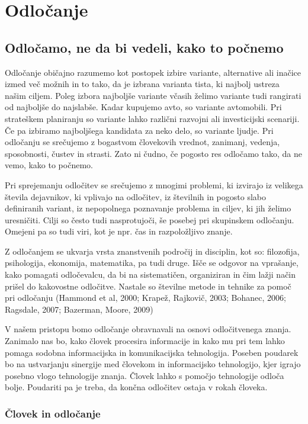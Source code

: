 \chapter{Odločanje}

\section{Odločamo, ne da bi vedeli, kako to počnemo}

Odločanje običajno razumemo kot postopek izbire variante, alternative ali inačice izmed več možnih in to tako, da je izbrana varianta tista, ki najbolj ustreza našim ciljem. Poleg izbora najboljše variante včasih želimo variante tudi rangirati od najboljše do najslabše. Kadar kupujemo avto, so variante avtomobili. Pri strateškem planiranju so variante lahko različni razvojni ali investicijski scenariji. Če pa izbiramo najboljšega kandidata za neko delo, so variante ljudje. Pri odločanju se srečujemo z bogastvom človekovih vrednot, zanimanj, vedenja, sposobnosti, čustev in strasti. Zato ni čudno, če pogosto res odločamo tako, da ne vemo, kako to počnemo.

Pri sprejemanju odločitev se srečujemo z mnogimi problemi, ki izvirajo iz velikega števila dejavnikov, ki vplivajo na odločitev, iz številnih in pogosto slabo definiranih variant, iz nepopolnega poznavanje problema in ciljev, ki jih želimo uresničiti. Cilji so često tudi nasprotujoči, še posebej pri skupinskem odločanju.  Omejeni pa so tudi viri, kot je npr. čas in razpoložljivo znanje.

Z odločanjem se ukvarja vrsta znanstvenih področij in disciplin, kot so: filozofija, psihologija, ekonomija, matematika, pa tudi druge. Išče se odgovor na vprašanje, kako pomagati odločevalcu, da bi na sistematičen, organiziran in  čim lažji način prišel do kakovostne odločitve. Nastale so številne metode in tehnike za pomoč pri odločanju (Hammond et al, 2000; Krapež, Rajkovič, 2003; Bohanec, 2006; Ragsdale, 2007; Bazerman, Moore, 2009)
 
V našem pristopu bomo odločanje obravnavali na osnovi odločitvenega znanja. Zanimalo nas bo, kako človek procesira informacije in kako mu pri tem lahko pomaga sodobna informacijska in komunikacijska tehnologija. Poseben poudarek bo na ustvarjanju sinergije med človekom in informacijsko tehnologijo, kjer igrajo posebno vlogo tehnologije znanja. Človek lahko s pomočjo tehnologije odloča bolje. Poudariti pa je  treba, da končna odločitev ostaja v rokah človeka.
 
\subsection{Človek in odločanje}

